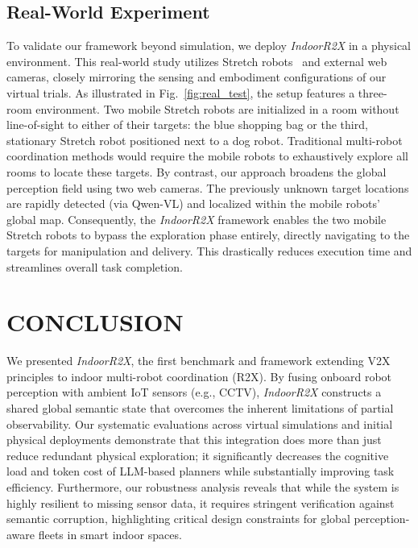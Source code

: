 \subsection{Real-World Experiment} 
To validate our framework beyond simulation, we deploy \textit{IndoorR2X} in a physical environment. This real-world study utilizes Stretch robots~\cite{kemp2022design} and external web cameras, closely mirroring the sensing and embodiment configurations of our virtual trials. As illustrated in Fig.~\ref{fig:real_test}, the setup features a three-room environment. Two mobile Stretch robots are initialized in a room without line-of-sight to either of their targets: the blue shopping bag or the third, stationary Stretch robot positioned next to a dog robot. Traditional multi-robot coordination methods would require the mobile robots to exhaustively explore all rooms to locate these targets. By contrast, our approach broadens the global perception field using two web cameras. The previously unknown target locations are rapidly detected (via Qwen-VL) and localized within the mobile robots' global map. Consequently, the \textit{IndoorR2X} framework enables the two mobile Stretch robots to bypass the exploration phase entirely, directly navigating to the targets for manipulation and delivery. This drastically reduces execution time and streamlines overall task completion.




\section{CONCLUSION}

We presented \textit{IndoorR2X}, the first benchmark and framework extending V2X principles to indoor multi-robot coordination (R2X). By fusing onboard robot perception with ambient IoT sensors (e.g., CCTV), \textit{IndoorR2X} constructs a shared global semantic state that overcomes the inherent limitations of partial observability. Our systematic evaluations across virtual simulations and initial physical deployments demonstrate that this integration does more than just reduce redundant physical exploration; it significantly decreases the cognitive load and token cost of LLM-based planners while substantially improving task efficiency. Furthermore, our robustness analysis reveals that while the system is highly resilient to missing sensor data, it requires stringent verification against semantic corruption, highlighting critical design constraints for global perception-aware fleets in smart indoor spaces.



\vspace{-0.5em}




